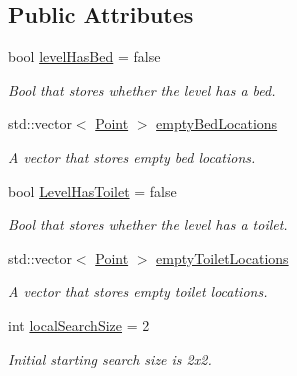 \subsection*{Public Attributes}
\begin{DoxyCompactItemize}
\item 
\mbox{\label{class_agent_behaviour_a2b26dafd1b01890c52803f19b18f846a}} 
bool \hyperlink{class_agent_behaviour_a2b26dafd1b01890c52803f19b18f846a}{level\+Has\+Bed} = false
\begin{DoxyCompactList}\small\item\em Bool that stores whether the level has a bed. \end{DoxyCompactList}\item 
\mbox{\label{class_agent_behaviour_a30450ea561add5573dffeb78b32e3bca}} 
std\+::vector$<$ \hyperlink{class_point}{Point} $>$ \hyperlink{class_agent_behaviour_a30450ea561add5573dffeb78b32e3bca}{empty\+Bed\+Locations}
\begin{DoxyCompactList}\small\item\em A vector that stores empty bed locations. \end{DoxyCompactList}\item 
\mbox{\label{class_agent_behaviour_af3def48bbce26581630f0f1cf3d2f67e}} 
bool \hyperlink{class_agent_behaviour_af3def48bbce26581630f0f1cf3d2f67e}{Level\+Has\+Toilet} = false
\begin{DoxyCompactList}\small\item\em Bool that stores whether the level has a toilet. \end{DoxyCompactList}\item 
\mbox{\label{class_agent_behaviour_ad2018440fabd1aaad74f6ce3c22c64f1}} 
std\+::vector$<$ \hyperlink{class_point}{Point} $>$ \hyperlink{class_agent_behaviour_ad2018440fabd1aaad74f6ce3c22c64f1}{empty\+Toilet\+Locations}
\begin{DoxyCompactList}\small\item\em A vector that stores empty toilet locations. \end{DoxyCompactList}\item 
\mbox{\label{class_agent_behaviour_ac541d443fc80b6c5d7758533d554648f}} 
int \hyperlink{class_agent_behaviour_ac541d443fc80b6c5d7758533d554648f}{local\+Search\+Size} = 2
\begin{DoxyCompactList}\small\item\em Initial starting search size is 2x2. \end{DoxyCompactList}\end{DoxyCompactItemize}


